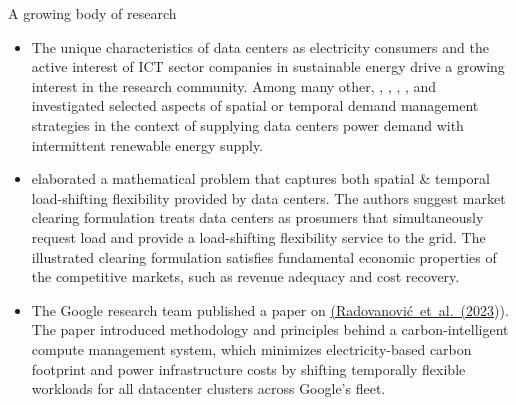 \begin{frame}{A growing body of research}

  {\footnotesize
  \begin{itemize}

  \item The unique characteristics of data centers as electricity consumers and the active interest of ICT sector companies in sustainable energy drive a growing interest in the research community. Among many other, , ,
  ,
  , and
   investigated selected aspects of spatial or temporal demand management strategies in the context of supplying data centers power demand with intermittent renewable energy supply. 
  
  \item {} elaborated a mathematical problem that captures both spatial \& temporal load-shifting flexibility provided by data centers. The authors suggest market clearing formulation treats data centers as prosumers that simultaneously request load and provide a load-shifting flexibility service to the grid. The illustrated clearing formulation satisfies fundamental economic properties of the competitive markets, such as revenue adequacy and cost recovery.

  \item The Google research team published a paper on  \href{https://doi.org/10.1109/TPWRS.2022.3173250}{(Radovanović~et~al.~(2023})). The paper introduced methodology and principles behind a carbon-intelligent compute management system, which minimizes electricity-based carbon footprint and power infrastructure costs by shifting temporally flexible workloads for all datacenter clusters across Google's fleet.

  \end{itemize}
  }

\end{frame}


